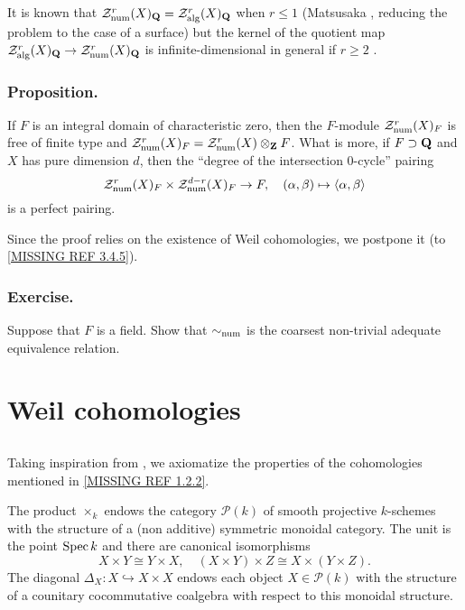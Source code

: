 \documentclass[../main.tex]{subfiles}
\begin{document}
It is known that $\mathcal{Z}^r_{\mathrm{num}}(X)_{\mathbf{Q}} = \mathcal{Z}^r_{\mathrm{alg}}(X)_{\mathbf{Q}}$ when $r \leq 1$ (Matsusaka \cite{matsusaka57}, reducing the problem to the case of a surface) but the kernel of the quotient map $\mathcal{Z}^r_{\mathrm{alg}}(X)_{\mathbf{Q}} \to \mathcal{Z}^r_{\mathrm{num}}(X)_{\mathbf{Q}}$ is infinite-dimensional in general if $r \geq 2$ \cite{Cl83}.

\subsubsection{Proposition.} If $F$ is an integral domain of characteristic zero, then the $F$-module $\mathcal{Z}^r_{\mathrm{num}}(X)_F$ is free of finite type and $\mathcal{Z}^r_{\mathrm{num}}(X)_F = \mathcal{Z}^r_{\mathrm{num}}(X) \otimes_{\mathbf{Z}} F$.
What is more, if $F \supset \mathbf{Q}$ and $X$ has pure dimension $d$, then the \enquote{degree of the intersection $0$-cycle} pairing
$$\mathcal{Z}^r_{\mathrm{num}}(X)_F \times \mathcal{Z}^{d-r}_{\mathrm{num}}(X)_F \to F,\quad (\alpha, \beta) \mapsto \langle \alpha, \beta\rangle$$
is a perfect pairing.

Since the proof relies on the existence of Weil cohomologies, we postpone it (to \ref{MISSING REF 3.4.5}).

\subsubsection{Exercise.} Suppose that $F$ is a field. Show that $\sim_{\mathrm{num}}$ is the coarsest non-trivial adequate equivalence relation.

\section{Weil cohomologies}

\subsection{} Taking inspiration from \cite{saavedra72}, we axiomatize the properties of the cohomologies mentioned in \ref{MISSING REF 1.2.2}.

The product $\times_k$ endows the category $\mathcal{P}(k)$ of smooth projective $k$-schemes with the structure of a (non additive) symmetric monoidal category.
The unit is the point $\operatorname{Spec} k$ and there are canonical isomorphisms
$$X \times Y \cong Y \times X,\quad (X \times Y) \times Z \cong X \times (Y \times Z).$$
The diagonal $\Delta_X : X \hookrightarrow X \times X$ endows each object $X \in \mathcal{P}(k)$ with the structure of a counitary cocommutative coalgebra with respect to this monoidal structure.
\end{document}

